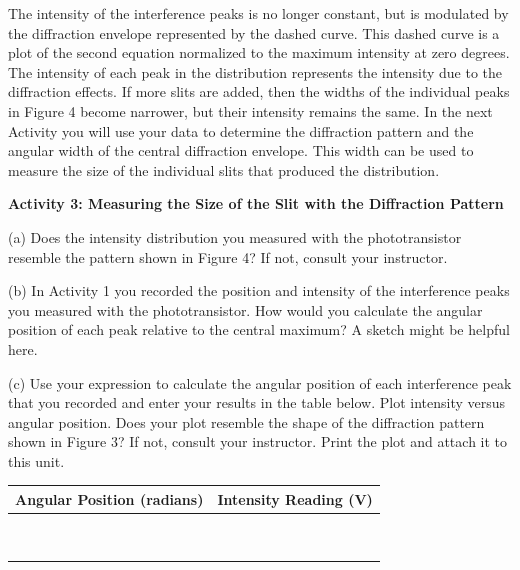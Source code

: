 The intensity of the interference peaks is no longer constant, but
is modulated by the diffraction envelope represented by the dashed
curve. This dashed curve is a plot of the second equation normalized
to the maximum intensity at zero degrees. The intensity of each peak
in the distribution represents the intensity due to the diffraction
effects. If more slits are added, then the widths of the individual
peaks in Figure 4 become narrower, but their intensity remains the
same. In the next Activity you will use your data to determine the
diffraction pattern and the angular width of the central diffraction
envelope. This width can be used to measure the size of the individual
slits that produced the distribution.

\textbf{Activity 3: Measuring the Size of the Slit with the Diffraction
Pattern }

(a) Does the intensity distribution you measured with the phototransistor
resemble the pattern shown in Figure 4? If not, consult your instructor.
\answerspace{20mm}

(b) In Activity 1 you recorded the position and intensity of the interference
peaks you measured with the phototransistor. How would you calculate
the angular position of each peak relative to the central maximum?
A sketch might be helpful here.
\answerspace{30mm}

\pagebreak
(c) Use your expression to calculate the angular position of each
interference peak that you recorded and enter your results in the
table below. Plot intensity versus angular position.
Does your plot resemble the shape of the diffraction pattern shown
in Figure 3? If not, consult your instructor. Print the plot and attach
it to this unit.

\vspace{0.3cm}
{\centering \begin{tabular}{|c|c|}
\hline 
Angular Position (radians)&
Intensity Reading (V)\\
\hline
\hline 
&
\\
\hline 
&
\\
\hline 
&
\\
\hline 
&
\\
\hline 
&
\\
\hline 
&
\\
\hline 
&
\\
\hline 
&
\\
\hline 
&
\\
\hline
\end{tabular}\par}
\vspace{0.3cm}

